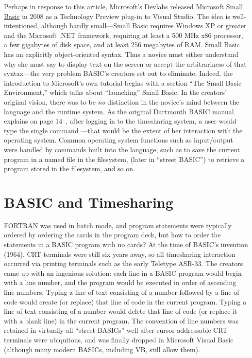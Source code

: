 \documentclass{article}
\begin{document}
Perhaps in response to this article, Microsoft's Devlabs 
released \href{http://smallbasic.com}{Microsoft Small Basic} in 2008 as a
Technology Preview plug-in to Visual Studio.
The idea is well-intentioned, although hardly small---Small Basic
requires Windows XP or greater and the Microsoft .NET framework,
requiring at least a 500
MHz x86 processor, a few gigabytes of disk space, and at least 256
megabytes of RAM.
Small Basic has an explicitly
object-oriented syntax.  Thus a novice must either understand why she
must say  to display text on the
screen or accept the arbitrariness of that syntax---the very problem
BASIC's creators set out to eliminate.  Indeed, the introduction to
Microsoft's own tutorial begins with a section ``The Small Basic
Environment,'' which talks about ``launching'' Small Basic.  In the
creators' original vision, there was to be \emph{no} distinction in the
novice's mind between the language and the runtime system.  As the
original Dartmouth BASIC manual explains on page
14~\cite{dartmouth_basic_manual}, after logging in to the timesharing
system, a user would type the single command ---that would be the
extent of her interaction with the operating system.  Common operating
system functions such as input/output were handled by commands built
into the language, such as  to save the current program in a
named file in the filesystem,  (later  in ``street
BASIC'') to retrieve a program stored in the filesystem, and so on.

\section{BASIC and Timesharing}

FORTRAN was used in batch mode, and program statements were typically
ordered by ordering the cards in the program deck, but how to order the
statements in a BASIC program with no cards?
At the time of BASIC's invention (1964), CRT terminals were still six
years away, so all timesharing interaction occurred via printing
terminals such as the early Teletype ASR-33.
The creators came up with an ingenious solution: each line in a BASIC
program would begin with a line number, and the program would be
executed in order of ascending line numbers.
Typing a line of text consisting of a number followed by a line of code
would create (or replace) that line of code in the current program.
Typing a line of text consisting of a number would delete that line of
code (or replace it with a blank line) in the current program.
The convention of line numbers was retained in virtually all ``street
BASICs'' well after cursor-addressable CRT terminals were ubiquitous,
and was finally dropped in Microsoft Visual Basic (although many modern
BASICs, including VB, still allow them).
\end{document}
